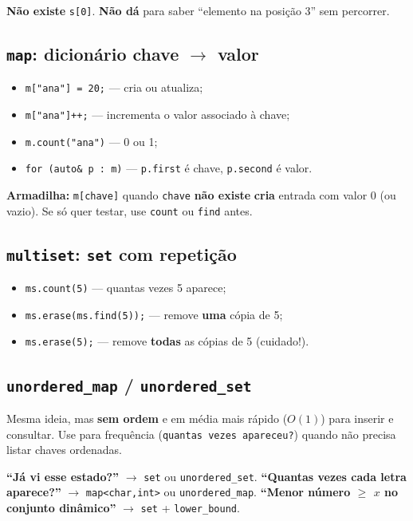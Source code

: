 \textbf{Não existe} \texttt{s[0]}. \textbf{Não dá} para saber ``elemento na posição 3'' sem percorrer.

\subsection{\texttt{map}: dicionário chave $\to$ valor}

\begin{itemize}[nosep]
  \item \texttt{m["ana"] = 20;} --- cria ou atualiza;
  \item \texttt{m["ana"]++;} --- incrementa o valor associado à chave;
  \item \texttt{m.count("ana")} --- 0 ou 1;
  \item \texttt{for (auto\& p : m)} --- \texttt{p.first} é chave, \texttt{p.second} é valor.
\end{itemize}

\textbf{Armadilha:} \texttt{m[chave]} quando \texttt{chave} \textbf{não existe} \textbf{cria} entrada com valor 0 (ou vazio). Se só quer testar, use \texttt{count} ou \texttt{find} antes.

\subsection{\texttt{multiset}: \texttt{set} com repetição}

\begin{itemize}[nosep]
  \item \texttt{ms.count(5)} --- quantas vezes 5 aparece;
  \item \texttt{ms.erase(ms.find(5));} --- remove \textbf{uma} cópia de 5;
  \item \texttt{ms.erase(5);} --- remove \textbf{todas} as cópias de 5 (cuidado!).
\end{itemize}

\subsection{\texttt{unordered\_map} / \texttt{unordered\_set}}

Mesma ideia, mas \textbf{sem ordem} e em média mais rápido ($O(1)$) para inserir e consultar.
Use para frequência (\texttt{quantas vezes apareceu?}) quando não precisa listar chaves ordenadas.

\begin{exemplodiabox}
\textbf{``Já vi esse estado?''} $\to$ \texttt{set} ou \texttt{unordered\_set}. \textbf{``Quantas vezes cada letra aparece?''} $\to$ \texttt{map<char,int>} ou \texttt{unordered\_map}. \textbf{``Menor número $\geq$ $x$ no conjunto dinâmico''} $\to$ \texttt{set} + \texttt{lower\_bound}.
\end{exemplodiabox}

